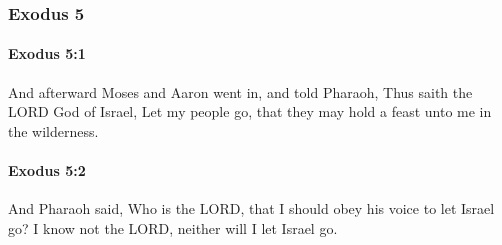 	\subsubsection{Exodus 5} %
		\label{EXODUS-5}

		\paragraph{Exodus 5:1} %
			\label{EXODUS-5-1}

			And afterward Moses and Aaron went in, and told Pharaoh, Thus saith the LORD God of Israel, Let my people go, that they may hold a feast unto me in the wilderness.


		\paragraph{Exodus 5:2} %
			\label{EXODUS-5-2}

			And Pharaoh said, Who is the LORD, that I should obey his voice to let Israel go? I know not the LORD, neither will I let Israel go.

